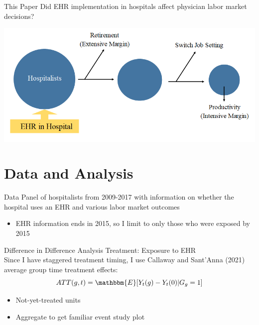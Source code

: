 \documentclass[10pt]{beamer}
\begin{document}
\begin{frame}{This Paper}
Did EHR implementation in hospitals affect physician labor market decisions?
                \vspace{4mm}
\begin{center}
\includegraphics[scale=.4]{Objects/EHR_FlowChart_General.PNG}
\end{center}
\end{frame}



\section{Data and Analysis}

\begin{frame}[fragile]{Data}
Panel of hospitalists from 2009-2017 with information on whether the hospital uses an EHR and various labor market outcomes\\
                \vspace{3mm}
\begin{itemize}
    \item EHR information ends in 2015, so I limit to only those who were exposed by 2015
\end{itemize}
\end{frame}


\begin{frame}{Difference in Difference Analysis}
Treatment: Exposure to EHR\\
                \vspace{4mm}
Since I have staggered treatment timing, I use Callaway and Sant'Anna (2021) average group time treatment effects:
$$ATT(g,t)=\mathbbm{E}[Y_t(g)-Y_t(0)|G_g=1]$$
                \vspace{3mm}
\begin{itemize}
    \item Not-yet-treated units
    \item Aggregate to get familiar event study plot
\end{itemize}
\end{frame}
\end{document}

